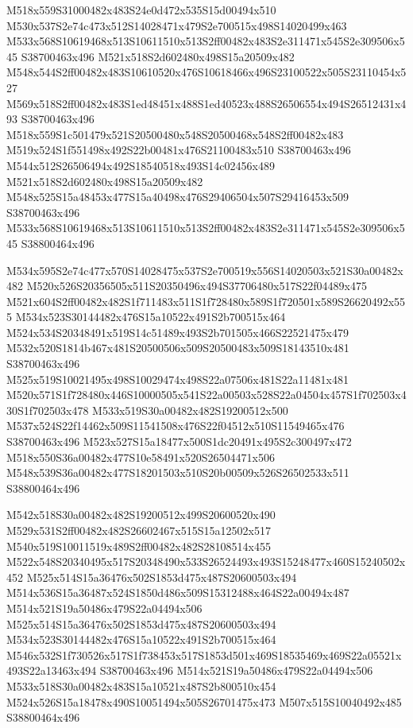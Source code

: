 \documentclass{article}
\begin{document}
\begin{multicols}{2}
M518x559S31000482x483S24e0d472x535S15d00494x510 M530x537S2e74c473x512S14028471x479S2e700515x498S14020499x463 M533x568S10619468x513S10611510x513S2ff00482x483S2e311471x545S2e309506x545 S38700463x496 M521x518S2d602480x498S15a20509x482 M548x544S2ff00482x483S10610520x476S10618466x496S23100522x505S23110454x527 M569x518S2ff00482x483S1ed48451x488S1ed40523x488S26506554x494S26512431x493 S38700463x496 M518x559S1c501479x521S20500480x548S20500468x548S2ff00482x483 M519x524S1f551498x492S22b00481x476S21100483x510 S38700463x496 M544x512S26506494x492S18540518x493S14c02456x489 M521x518S2d602480x498S15a20509x482 M548x525S15a48453x477S15a40498x476S29406504x507S29416453x509 S38700463x496 M533x568S10619468x513S10611510x513S2ff00482x483S2e311471x545S2e309506x545 S38800464x496

M534x595S2e74c477x570S14028475x537S2e700519x556S14020503x521S30a00482x482 M520x526S20356505x511S20350496x494S37706480x517S22f04489x475 M521x604S2ff00482x482S1f711483x511S1f728480x589S1f720501x589S26620492x555 M534x523S30144482x476S15a10522x491S2b700515x464 M524x534S20348491x519S14c51489x493S2b701505x466S22521475x479 M532x520S1814b467x481S20500506x509S20500483x509S18143510x481 S38700463x496 M525x519S10021495x498S10029474x498S22a07506x481S22a11481x481 M520x571S1f728480x446S10000505x541S22a00503x528S22a04504x457S1f702503x430S1f702503x478 M533x519S30a00482x482S19200512x500 M537x524S22f14462x509S11541508x476S22f04512x510S11549465x476 S38700463x496 M523x527S15a18477x500S1dc20491x495S2c300497x472 M518x550S36a00482x477S10e58491x520S26504471x506 M548x539S36a00482x477S18201503x510S20b00509x526S26502533x511 S38800464x496

M542x518S30a00482x482S19200512x499S20600520x490 M529x531S2ff00482x482S26602467x515S15a12502x517 M540x519S10011519x489S2ff00482x482S28108514x455 M522x548S20340495x517S20348490x533S26524493x493S15248477x460S15240502x452 M525x514S15a36476x502S1853d475x487S20600503x494 M514x536S15a36487x524S1850d486x509S15312488x464S22a00494x487 M514x521S19a50486x479S22a04494x506 M525x514S15a36476x502S1853d475x487S20600503x494 M534x523S30144482x476S15a10522x491S2b700515x464 M546x532S1f730526x517S1f738453x517S1853d501x469S18535469x469S22a05521x493S22a13463x494 S38700463x496 M514x521S19a50486x479S22a04494x506 M533x518S30a00482x483S15a10521x487S2b800510x454 M524x526S15a18478x490S10051494x505S26701475x473 M507x515S10040492x485 S38800464x496


\end{multicols}
\end{document}
